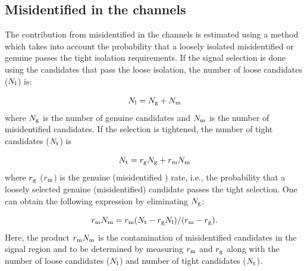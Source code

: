 \subsection{\texorpdfstring{Misidentified \Tau in the \leptonTau channels}{Misidentified tau in the lepton-tau channels}}
\label{sect:bkgFake}
The contribution from misidentified \Tau in the \leptonTau channels is estimated using a method which takes into account the probability 
that a loosely isolated misidentified or genuine \Tau passes the tight isolation requirements.
If the signal selection is done using the \Tau candidates that pass the loose isolation, 
the number of loose \Tau candidates ($N_{\rm l}$) is:

\begin{equation}
N_{\rm l} = N_{\rm g} + N_{\rm m}
\end{equation}
where $N_{\rm g}$ is the number of genuine \Tau candidates and $N_{\rm m}$ is the number of misidentified 
\Tau candidates. If the selection is tightened, the number of tight \Tau candidates ($N_{\rm t}$)  is

\begin{equation}
 N_{\rm t} = r_{\rm g} N_{\rm g} + r_{\rm m} N_{\rm m}
\end{equation} 
where $r_{\rm g}$ ($r_{\rm m}$) is the genuine (misidentified \Tau) rate, i.e., the probability that a loosely selected genuine (misidentified) \Tau candidate passes the  tight  selection. 
One can obtain the following expression by eliminating $N_{\rm g}$:

\begin{equation}
   r_{\rm m} N_{\rm m}  = r_{\rm m} (N_{\rm t} - r_{\rm g} N_{\rm l})/(r_{\rm m}-r_{\rm g}).
\end{equation}
Here, the product $r_{\rm m} N_{\rm m}$ is the contamination of misidentified \Tau candidates in the signal region and to be determined by measuring $r_{\rm m}$ and $r_{\rm g}$ along with the number of loose \Tau candidates ($N_{\rm l}$) and number of tight \Tau candidates ($N_{\rm t}$).

